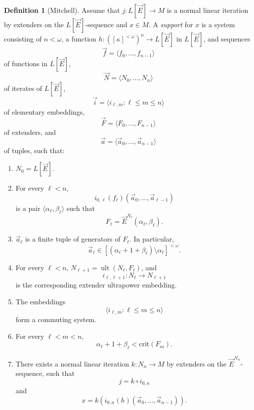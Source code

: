 \documentclass{article}
\theoremstyle{definition}
\newtheorem{definition}{Definition}[section]
\theoremstyle{plain}
\newcommand{\la}{\langle}
\newcommand{\ra}{\rangle}
\DeclareMathOperator{\Ult}{ult}
\begin{document}
\begin{definition}[Mitchell]\label{Def:Supports}
    Assume that $j\colon L[\vec{E}]\to M$ is a normal linear iteration by extenders on the $L[\vec{E}]$-sequence and $x\in M$. A \textit{support} for $x$ is a system consisting of $n<\omega$, a function $h\colon ([\kappa]^{<\omega})^n\to L[\vec E]$ in $L[\vec E]$, and sequences 
    $$\vec{f} = \la f_0,\ldots,f_{n-1} \ra$$
    of functions in $L[\vec E]$,
    $$\vec{N} = \la N_0,\ldots,N_n \ra$$
    of iterates of $L[\vec{E}]$,
    $$\vec{i} = \la i_{\ell,m}\colon \ell\leq m\leq n \ra$$
    of elementary embeddings,
    $$\vec{F} = \la F_0,\ldots,F_{n-1} \ra$$
    of extenders, and
    $$\vec{a} = \la \vec{a}_0,\ldots,\vec{a}_{n-1} \ra$$
    of tuples, such that:
    \begin{enumerate}
        \item $N_0 = L[\vec{E}]$.
        
        \item For every $\ell<n$, 
        $$i_{0,\ell}(f_{\ell})(\vec{a}_0,\ldots,\vec{a}_{\ell-1})$$
        is a pair $\la \alpha_{\ell},\beta_{\ell}\ra$ such that
        $$F_{\ell} = \vec{E}^{N_{\ell}}(\alpha_{\ell},\beta_{\ell}).$$
        
        \item $\vec{a}_\ell$ is a finite tuple of generators of $F_\ell$. In particular,
        $$\vec{a}_{\ell}\in [(\alpha_{\ell}+1+\beta_{\ell})\setminus\alpha_{\ell}]^{<\omega}.$$
        
        \item For every $\ell<n$, $N_{\ell+1} = \Ult(N_\ell,F_\ell)$, and
        $$i_{\ell,\ell+1}\colon N_\ell\to N_{\ell+1}$$
        is the corresponding extender ultrapower embedding.
        
        \item The embeddings 
        $$\la i_{\ell,m}\colon \ell\leq m\leq n\ra$$
        form a commuting system.
        
        \item For every $\ell<m<n$,
        $$\alpha_{\ell}+1+\beta_{\ell}<\text{crit}(F_m).$$
        
        \item There exists a normal linear iteration $k\colon N_n\to M$ by extenders on the $\vec{E}^{N_n}$-sequence,  such that
        $$j=k\circ i_{0,n}$$
        and
        $$x=k\left(i_{0,n}(h)(\vec{a}_0,\ldots,\vec{a}_{n-1})\right).$$
    \end{enumerate}
\end{definition}
\end{document}
